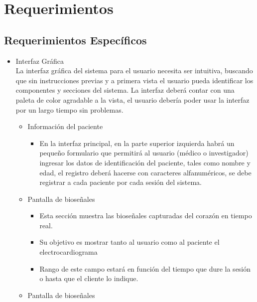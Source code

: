 \section{Requerimientos}

\subsection{Requerimientos Específicos}

\begin{itemize}
    \item Interfaz Gráfica\\
          La interfaz gráfica del sistema para el usuario necesita ser intuitiva, buscando que sin instrucciones previas y a primera vista el usuario pueda identificar los componentes y secciones del sistema. La interfaz deberá contar con una paleta de color agradable a la vista, el usuario debería poder usar la interfaz por un largo tiempo sin problemas.\\
          \begin{itemize}
              \item Información del paciente
                    \begin{itemize}
                        \item En la interfaz principal, en la parte superior izquierda habrá un pequeño formulario que permitirá al usuario (médico o investigador) ingresar los datos de identificación del paciente, tales como nombre y edad, el registro deberá hacerse con caracteres alfanuméricos, se debe registrar a cada paciente por cada sesión del sistema.\\
                    \end{itemize}
              \item Pantalla de bioseñales
                    \begin{itemize}
                        \item Esta sección muestra las bioseñales capturadas del corazón en tiempo real.
                        \item Su objetivo es mostrar tanto al usuario como al paciente el electrocardiograma
                        \item Rango de este campo estará en función del tiempo que dure la sesión o hasta que el cliente lo indique.
                    \end{itemize}
              \item Pantalla de bioseñales
                    \begin{itemize}

\end{itemize}
\end{itemize}
\end{itemize}
